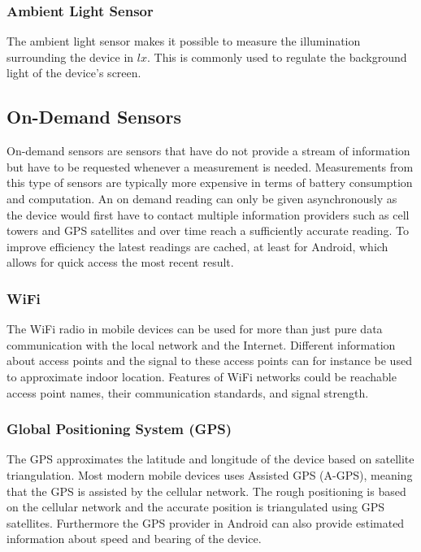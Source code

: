 \subsubsection{Ambient Light Sensor}

The ambient light sensor makes it possible to measure the illumination surrounding the device in $lx$. This is commonly used to regulate the background light of the device's screen.

\subsection{On-Demand Sensors}
On-demand sensors are sensors that have do not provide a stream of information but have to be requested whenever a measurement is needed. Measurements from this type of sensors are typically more expensive in terms of battery consumption and computation. An on demand reading can only be given asynchronously as the device would first have to contact multiple information providers such as cell towers and GPS satellites and over time reach a sufficiently accurate reading. To improve efficiency the latest readings are cached, at least for Android, which allows for quick access the most recent result.

\subsubsection{WiFi}
The WiFi radio in mobile devices can be used for more than just pure data communication with the local network and the Internet. Different information about access points and the signal to these access points can for instance be used to approximate indoor location.  
Features of WiFi networks could be reachable access point names, their communication standards, and signal strength. 

\subsubsection{Global Positioning System (GPS)}
The GPS approximates the latitude and longitude of the device based on satellite triangulation. Most modern mobile devices uses Assisted GPS (A-GPS), meaning that the GPS is assisted by the cellular network. The rough positioning is based on the cellular network and the accurate position is triangulated using GPS satellites. Furthermore the GPS provider in Android can also provide estimated information about speed and bearing of the device.


